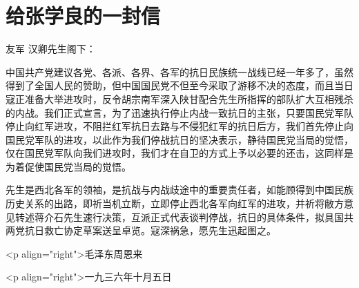 \section[给张学良的一封信（一九三六年十月五）]{给张学良的一封信}


友军
汉卿先生阁下：

中国共产党建议各党、各派、各界、各军的抗日民族统一战线已经一年多了，虽然得到了全国人民的赞助，但中国国民党不但至今采取了游移不决的态度，而且当日寇正准备大举进攻时，反令胡宗南军深入陕甘配合先生所指挥的部队扩大互相残杀的内战。我们正式宣言，为了迅速执行停止内战一致抗日的主张，只要国民党军队停止向红军进攻，不阻拦红军抗日去路与不侵犯红军的抗日后方，我们首先停止向国民党军队的进攻，以此作为我们停战抗日的坚决表示，静待国民党当局的觉悟，仅在国民党军队向我们进攻时，我们才在自卫的方式上予以必要的还击，这同样是为着促使国民党当局的觉悟。

先生是西北各军的领袖，是抗战与内战歧途中的重要责任者，如能顾得到中国民族历史关系的出路，即祈当机立断，立即停止西北各军向红军的进攻，并祈将敝方意见转述蒋介石先生速行决策，互派正式代表谈判停战，抗日的具体条件，拟具国共两党抗日救亡协定草案送呈卓览。寇深祸急，愿先生迅起图之。

<p align="right">毛泽东周恩来

<p align="right">一九三六年十月五日

